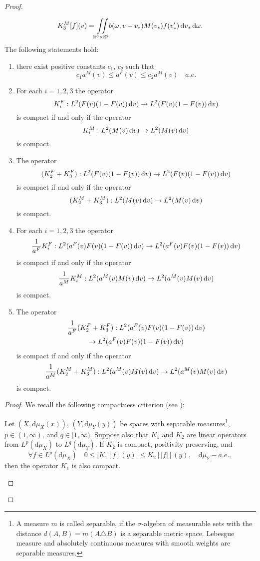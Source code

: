 \begin{proof}
\begin{lemma}
\[
K^M_3[f](v) = {\iint\limits_{\mathbb R^3\times\mathbb S^2}} b(\omega,v-v_\ast )M(v_\ast ) f(v'_\ast ){\,\mathrm{d} v}_\ast  {\,\mathrm{d} \omega} .
\]
The following statements hold:
\begin{enumerate}
\item there exist positive constants $c_1$, $c_2$ such that
\begin{equation}\label{eq:a-equiv}
c_1a^M(v)\le a^F(v)\le c_2a^M(v)\quad a.e.
\end{equation}
\item \label{it:simple:one} For each $i=1,2,3$ the operator \[K^F_i: L^2( F(v)(1-F(v)){\,\mathrm{d} v})\to L^2( F(v)(1-F(v)){\,\mathrm{d} v})\] is compact if and only if the operator \[K^M_i: L^2( M(v){\,\mathrm{d} v})\to L^2( M(v){\,\mathrm{d} v})\] is compact.
\item \label{it:simple:sum}  The operator \[(K^F_2+K^F_3): L^2( F(v)(1-F(v)){\,\mathrm{d} v})\to L^2( F(v)(1-F(v)){\,\mathrm{d} v})\] is compact if and only if the operator \[(K^M_2+K^M_3): L^2( M(v){\,\mathrm{d} v})\to L^2( M(v){\,\mathrm{d} v})\] is compact.
\item \label{it:complex:one} For each $i=1,2,3$ the operator \[\frac{1}{a^F}K^F_i: L^2( a^F(v)F(v)(1-F(v)){\,\mathrm{d} v})\to L^2( a^F(v)F(v)(1-F(v)){\,\mathrm{d} v})\] is compact if and only if the operator \[\frac{1}{a^M}K^M_i: L^2( a^M(v)M(v){\,\mathrm{d} v})\to L^2( a^M(v)M(v){\,\mathrm{d} v})\] is compact.
\item \label{it:complex:sum} The operator  \begin{multline*}
	\frac{1}{a^F}(K^F_2+K^F_3): L^2( a^F(v)F(v)(1-F(v)){\,\mathrm{d} v})\\\to L^2( a^F(v)F(v)(1-F(v)){\,\mathrm{d} v})
\end{multline*}  is compact if and only if the operator \[\frac{1}{a^M}(K^M_2+K^M_3): L^2( a^M(v)M(v){\,\mathrm{d} v})\to L^2( a^M(v)M(v){\,\mathrm{d} v})\] is compact.
\end{enumerate}
\end{lemma}


\begin{proof}
We recall the following compactness criterion (see \cite{pitt1979compactness}):
\begin{theorem}\label{th:pitt} Let $(X,\mathrm d\mu_X(x))$, $(Y,\mathrm d\mu_Y(y))$ be  spaces with separable measures\footnote{A measure $m$ is called separable, if the $\sigma$-algebra of measurable sets with the distance $d(A,B)=m(A\triangle B)$ is a separable metric space. Lebesgue measure and absolutely continuous measures with smooth weights are separable measures.},  $p\in(1,\infty)$, and $q\in[1,\infty)$. Suppose also that $K_1$ and $K_2$ are linear operators from $L^p(\mathrm d\mu_X)$ to $L^q(\mathrm d\mu_Y)$.
If $K_2$ is compact, positivity preserving, and
\[\forall f\in L^p(\mathrm d\mu_X)\quad 0\le |K_1[f](y)|\le K_2[|f|](y),\quad \mathrm d\mu_Y-a.e.,\]
then the operator $K_1$ is also compact.
\end{theorem}



\end{proof}
\end{proof}
